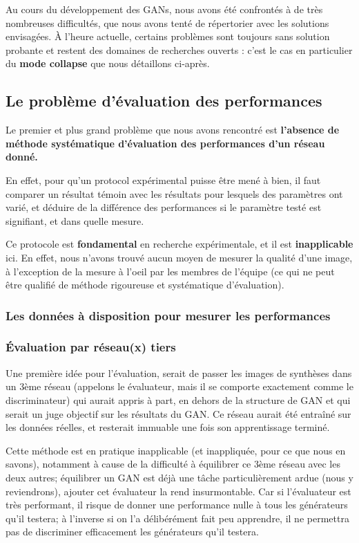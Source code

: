 Au cours du développement des GANs, nous avons été confrontés à de très nombreuses difficultés, que nous avons tenté de répertorier avec les solutions envisagées. À l'heure actuelle, certains problèmes sont toujours sans solution probante et restent des domaines de recherches ouverts : c'est le cas en particulier du \textbf{mode collapse} que nous détaillons ci-après.

\subsection{Le problème d'évaluation des performances}

Le premier et plus grand problème que nous avons rencontré est \textbf{l'absence de méthode systématique d'évaluation des performances d'un réseau donné.}

En effet, pour qu'un protocol expérimental puisse être mené à bien, il faut comparer un résultat témoin avec les résultats pour lesquels des paramètres ont varié, et déduire de la différence des performances si le paramètre testé est signifiant, et dans quelle mesure.

Ce protocole est \textbf{fondamental} en recherche expérimentale, et il est \textbf{inapplicable} ici. En effet, nous n'avons trouvé aucun moyen de mesurer la qualité d'une image, à l'exception de la mesure à l'oeil par les membres de l'équipe (ce qui ne peut être qualifié de méthode rigoureuse et systématique d'évaluation). 

\subsubsection{Les données à disposition pour mesurer les performances}



\subsubsection{Évaluation par réseau(x) tiers}

Une première idée pour l'évaluation, serait de passer les images de synthèses dans un 3ème réseau (appelons le évaluateur, mais il se comporte exactement comme le discriminateur) qui aurait appris à part, en dehors de la structure de GAN et qui serait un juge objectif sur les résultats du GAN. Ce réseau aurait été entraîné sur les données réelles, et resterait immuable une fois son apprentissage terminé. 

Cette méthode est en pratique inapplicable (et inappliquée, pour ce que nous en savons), notamment à cause de la difficulté à équilibrer ce 3ème réseau avec les deux autres; équilibrer un GAN est déjà une tâche particulièrement ardue (nous y reviendrons), ajouter cet évaluateur la rend insurmontable. Car si l'évaluateur est très performant, il risque de donner une performance nulle à tous les générateurs qu'il testera; à l'inverse si on l'a délibérément fait peu apprendre, il ne permettra pas de discriminer efficacement les générateurs qu'il testera.

